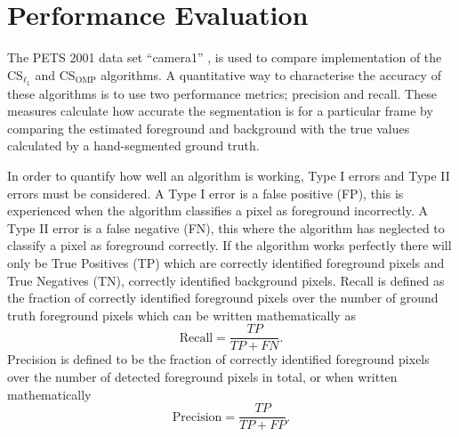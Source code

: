 




\section{Performance Evaluation}\label{sec:results}

The PETS 2001 data set ``camera1''  \cite{pets2001},  is used to compare implementation of the CS$_{\ell_1}$ and CS$_{\text{OMP}}$ algorithms. A quantitative way to characterise the accuracy of these algorithms is to use two performance metrics; precision and recall.  These measures calculate how accurate the segmentation is for a particular frame by comparing the estimated foreground and background with the true values calculated by a hand-segmented ground truth.

In order to quantify how well an algorithm is working, Type I errors and Type II errors must be considered. A Type I error is a false positive (FP), this is experienced when the algorithm classifies a pixel as foreground incorrectly. A Type II error is a false negative (FN), this where the algorithm has neglected to classify a pixel as foreground correctly. If the algorithm works perfectly there will only be True Positives (TP) which are correctly identified foreground pixels and True Negatives (TN), correctly identified background pixels.
Recall is defined as the fraction of correctly identified foreground pixels over the number of ground truth foreground pixels which can be written mathematically as
\begin{equation}
  \label{eq:1}
\text{Recall} = \frac{TP}{TP + FN}. 
\end{equation}
Precision is defined to be the fraction of correctly identified foreground pixels over the number of detected foreground pixels in total, or when written mathematically
\begin{equation}
  \label{eq:2}
\text{Precision} = \frac{TP}{TP + FP}.
\end{equation} 

